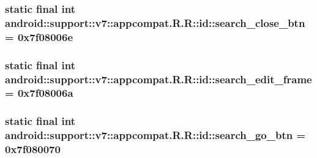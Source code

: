 \hypertarget{classandroid_1_1support_1_1v7_1_1appcompat_1_1_r_1_1id_ae0d9823033d513cb6da2e9943f4feef}{
\subsubsection[{search\_\-close\_\-btn}]{\setlength{\rightskip}{0pt plus 5cm}static final int android::support::v7::appcompat.R.R::id::search\_\-close\_\-btn = 0x7f08006e}}
\label{classandroid_1_1support_1_1v7_1_1appcompat_1_1_r_1_1id_ae0d9823033d513cb6da2e9943f4feef}


\hypertarget{classandroid_1_1support_1_1v7_1_1appcompat_1_1_r_1_1id_3c2060c10903b63ff303f819dba38313}{
\subsubsection[{search\_\-edit\_\-frame}]{\setlength{\rightskip}{0pt plus 5cm}static final int android::support::v7::appcompat.R.R::id::search\_\-edit\_\-frame = 0x7f08006a}}
\label{classandroid_1_1support_1_1v7_1_1appcompat_1_1_r_1_1id_3c2060c10903b63ff303f819dba38313}


\hypertarget{classandroid_1_1support_1_1v7_1_1appcompat_1_1_r_1_1id_e49956b921d575a161a8d49a87880590}{
\subsubsection[{search\_\-go\_\-btn}]{\setlength{\rightskip}{0pt plus 5cm}static final int android::support::v7::appcompat.R.R::id::search\_\-go\_\-btn = 0x7f080070}}
\label{classandroid_1_1support_1_1v7_1_1appcompat_1_1_r_1_1id_e49956b921d575a161a8d49a87880590}


